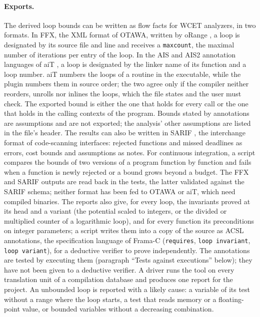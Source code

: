 \documentclass[oneside,english]{amsart}
\numberwithin{equation}{section}
\numberwithin{figure}{section}
\theoremstyle{plain}
\theoremstyle{definition}
\theoremstyle{plain}
\theoremstyle{remark}
\theoremstyle{plain}
\theoremstyle{definition}
\theoremstyle{plain}
\theoremstyle{remark}
\begin{document}
\paragraph{Exports.}
The derived loop bounds can be written as flow facts for WCET analyzers, in two formats. In FFX, the XML format of OTAWA, written by oRange \cite{bonenfant2012ffx}, a loop is designated by its source file and line and receives a \texttt{maxcount}, the maximal number of iterations per entry of the loop. In the AIS and AIS2 annotation languages of aiT \cite{heckmann2013ait}, a loop is designated by the linker name of its function and a loop number. aiT numbers the loops of a routine in the executable, while the plugin numbers them in source order; the two agree only if the compiler neither reorders, unrolls nor inlines the loops, which the file states and the user must check. The exported bound is either the one that holds for every call or the one that holds in the calling contexts of the program. Bounds stated by annotations are assumptions and are not exported; the analysis' other assumptions are listed in the file's header. The results can also be written in SARIF \cite{sarif2023}, the interchange format of code-scanning interfaces: rejected functions and missed deadlines as errors, cost bounds and assumptions as notes. For continuous integration, a script compares the bounds of two versions of a program function by function and fails when a function is newly rejected or a bound grows beyond a budget. The FFX and SARIF outputs are read back in the tests, the latter validated against the SARIF schema; neither format has been fed to OTAWA or aiT, which need compiled binaries. The reports also give, for every loop, the invariants proved at its head and a variant (the potential scaled to integers, or the divided or multiplied counter of a logarithmic loop), and for every function its preconditions on integer parameters; a script writes them into a copy of the source as ACSL annotations, the specification language of Frama-C \cite{kirchner2015framac} (\texttt{requires}, \texttt{loop invariant}, \texttt{loop variant}), for a deductive verifier to prove independently. The annotations are tested by executing them (paragraph ``Tests against executions'' below); they have not been given to a deductive verifier. A driver runs the tool on every translation unit of a compilation database and produces one report for the project. An unbounded loop is reported with a likely cause: a variable of its test without a range where the loop starts, a test that reads memory or a floating-point value, or bounded variables without a decreasing combination.
\end{document}
